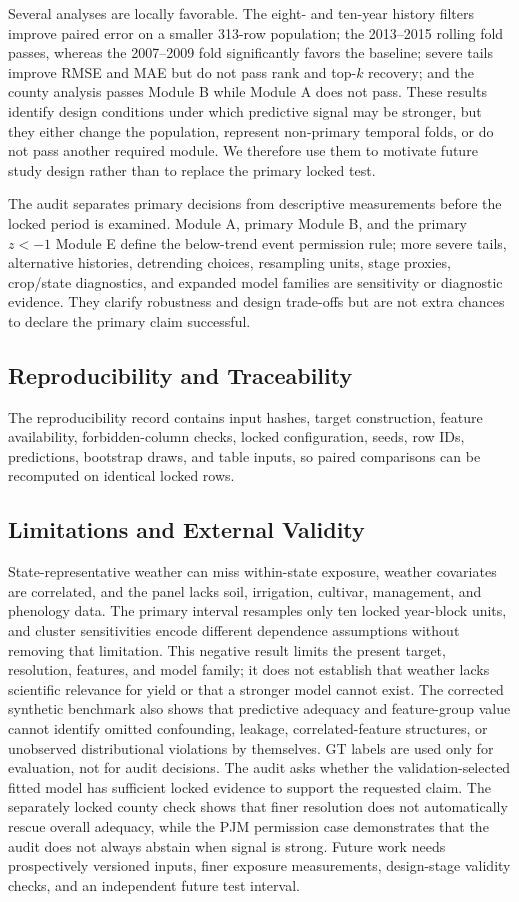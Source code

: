 \documentclass[conference]{IEEEtran}
\begin{document}
Several analyses are locally favorable. The eight- and ten-year history filters
improve paired error on a smaller 313-row population; the 2013--2015 rolling fold
passes, whereas the 2007--2009 fold significantly favors the baseline; severe
tails improve RMSE and MAE but do not pass rank and top-$k$ recovery; and the county
analysis passes Module B while Module A does not pass. These results
identify design conditions under which predictive signal may be stronger, but
they either change the population, represent non-primary temporal folds, or do not pass
another required module. We therefore use them to motivate future study design
rather than to replace the primary locked test.

The audit separates primary decisions from descriptive measurements before the
locked period is examined. Module A, primary Module B, and the primary $z<-1$
Module E define the below-trend event permission rule; more severe tails,
alternative histories, detrending choices, resampling units, stage proxies,
crop/state diagnostics, and expanded model families are sensitivity or diagnostic
evidence. They clarify robustness and design trade-offs but are not extra chances
to declare the primary claim successful.

\subsection{Reproducibility and Traceability}
The reproducibility record contains input hashes, target construction, feature
availability, forbidden-column checks, locked configuration, seeds, row IDs,
predictions, bootstrap draws, and table inputs, so paired comparisons can be
recomputed on identical locked rows.

\subsection{Limitations and External Validity}
State-representative weather can miss within-state exposure, weather covariates
are correlated, and the panel lacks soil, irrigation, cultivar, management, and
phenology data. The primary interval resamples only ten locked year-block units, and
cluster sensitivities encode different dependence assumptions without removing
that limitation. This negative result limits the present target, resolution,
features, and model family; it does not establish that weather lacks scientific
relevance for yield or that a stronger model cannot exist. The corrected synthetic
benchmark also shows that predictive adequacy and feature-group value cannot
identify omitted confounding, leakage, correlated-feature structures, or unobserved
distributional violations by themselves. GT labels are used only for evaluation,
not for audit decisions. The audit asks whether the validation-selected fitted
model has sufficient locked evidence to support the requested claim. The separately
locked county check shows that finer resolution does not automatically rescue
overall adequacy, while the PJM permission case demonstrates that the audit does
not always abstain when signal is strong.
Future work needs prospectively versioned inputs, finer exposure measurements,
design-stage validity checks, and an independent future test interval.
\end{document}
